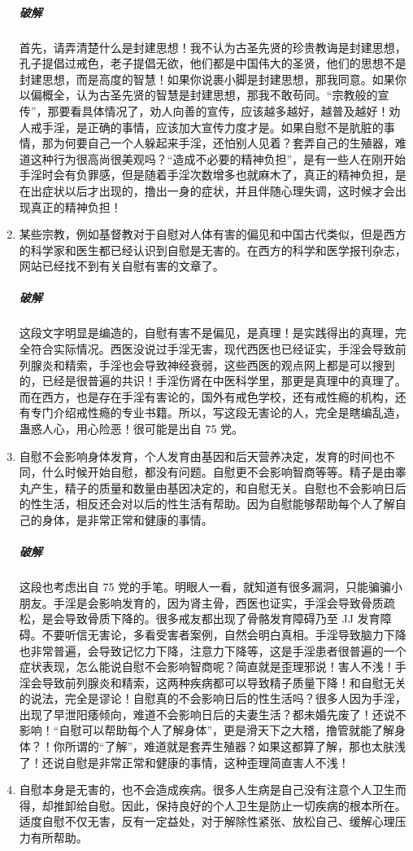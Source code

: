 \begin{enumerate}
    \subparagraph{破解} 首先，请弄清楚什么是封建思想！我不认为古圣先贤的珍贵教诲是封建思想，孔子提倡过戒色，老子提倡无欲，他们都是中国伟大的圣贤，他们的思想不是封建思想，而是高度的智慧！如果你说裹小脚是封建思想，那我同意。如果你以偏概全，认为古圣先贤的智慧是封建思想，那我不敢苟同。“宗教般的宣传”，那要看具体情况了，劝人向善的宣传，应该越多越好，越普及越好！劝人戒手淫，是正确的事情，应该加大宣传力度才是。如果自慰不是肮脏的事情，那为何要自己一个人躲起来手淫，还怕别人见着？套弄自己的生殖器，难道这种行为很高尚很美观吗？“造成不必要的精神负担”，是有一些人在刚开始手淫时会有负罪感，但是随着手淫次数增多也就麻木了，真正的精神负担，是在出症状以后才出现的，撸出一身的症状，并且伴随心理失调，这时候才会出现真正的精神负担！
    \item 某些宗教，例如基督教对于自慰对人体有害的偏见和中国古代类似，但是西方的科学家和医生都已经认识到自慰是无害的。在西方的科学和医学报刊杂志，网站已经找不到有关自慰有害的文章了。
    \subparagraph{破解} 这段文字明显是编造的，自慰有害不是偏见，是真理！是实践得出的真理，完全符合实际情况。西医没说过手淫无害，现代西医也已经证实，手淫会导致前列腺炎和精索，手淫也会导致神经衰弱，这些西医的观点网上都是可以搜到的，已经是很普遍的共识！手淫伤肾在中医科学里，那更是真理中的真理了。而在西方，也是存在手淫有害论的，国外有戒色学校，还有戒性瘾的机构，还有专门介绍戒性瘾的专业书籍。所以，写这段无害论的人，完全是瞎编乱造，蛊惑人心，用心险恶！很可能是出自 75 党。
    \item 自慰不会影响身体发育，个人发育由基因和后天营养决定，发育的时间也不同，什么时候开始自慰，都没有问题。自慰更不会影响智商等等。精子是由睾丸产生，精子的质量和数量由基因决定的，和自慰无关。自慰也不会影响日后的性生活，相反还会对以后的性生活有帮助。因为自慰能够帮助每个人了解自己的身体，是非常正常和健康的事情。
    \subparagraph{破解} 这段也考虑出自 75 党的手笔。明眼人一看，就知道有很多漏洞，只能骗骗小朋友。手淫是会影响发育的，因为肾主骨，西医也证实，手淫会导致骨质疏松，是会导致骨质下降的。很多戒友都出现了骨骼发育障碍乃至 JJ 发育障碍。不要听信无害论，多看受害者案例，自然会明白真相。手淫导致脑力下降也非常普遍，会导致记忆力下降，注意力下降等，这是手淫患者很普遍的一个症状表现，怎么能说自慰不会影响智商呢？简直就是歪理邪说！害人不浅！手淫会导致前列腺炎和精索，这两种疾病都可以导致精子质量下降！和自慰无关的说法，完全是谬论！自慰真的不会影响日后的性生活吗？很多人因为手淫，出现了早泄阳痿倾向，难道不会影响日后的夫妻生活？都未婚先废了！还说不影响！“自慰可以帮助每个人了解身体”，更是滑天下之大稽，撸管就能了解身体？！你所谓的“了解”，难道就是套弄生殖器？如果这都算了解，那也太肤浅了！还说自慰是非常正常和健康的事情，这种歪理简直害人不浅！
    \item 自慰本身是无害的，也不会造成疾病。很多人生病是自己没有注意个人卫生而得，却推卸给自慰。因此，保持良好的个人卫生是防止一切疾病的根本所在。适度自慰不仅无害，反有一定益处，对于解除性紧张、放松自己、缓解心理压力有所帮助。

\end{enumerate}

